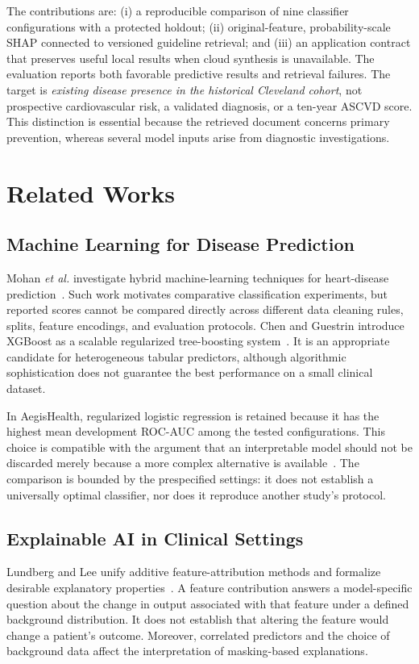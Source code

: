 \documentclass[journal]{IEEEtran}
\newcommand{\system}{AegisHealth}
\begin{document}
The contributions are: (i) a reproducible comparison of nine classifier configurations with a protected holdout; (ii) original-feature, probability-scale SHAP connected to versioned guideline retrieval; and (iii) an application contract that preserves useful local results when cloud synthesis is unavailable. The evaluation reports both favorable predictive results and retrieval failures. The target is \emph{existing disease presence in the historical Cleveland cohort}, not prospective cardiovascular risk, a validated diagnosis, or a ten-year ASCVD score. This distinction is essential because the retrieved document concerns primary prevention, whereas several model inputs arise from diagnostic investigations.

\section{Related Works}
\subsection{Machine Learning for Disease Prediction}
Mohan \emph{et al.} investigate hybrid machine-learning techniques for heart-disease prediction~\cite{mohan2019}. Such work motivates comparative classification experiments, but reported scores cannot be compared directly across different data cleaning rules, splits, feature encodings, and evaluation protocols. Chen and Guestrin introduce XGBoost as a scalable regularized tree-boosting system~\cite{chen2016}. It is an appropriate candidate for heterogeneous tabular predictors, although algorithmic sophistication does not guarantee the best performance on a small clinical dataset.

In \system{}, regularized logistic regression is retained because it has the highest mean development ROC-AUC among the tested configurations. This choice is compatible with the argument that an interpretable model should not be discarded merely because a more complex alternative is available~\cite{rudin2019}. The comparison is bounded by the prespecified settings: it does not establish a universally optimal classifier, nor does it reproduce another study's protocol.

\subsection{Explainable AI in Clinical Settings}
Lundberg and Lee unify additive feature-attribution methods and formalize desirable explanatory properties~\cite{lundberg2017}. A feature contribution answers a model-specific question about the change in output associated with that feature under a defined background distribution. It does not establish that altering the feature would change a patient's outcome. Moreover, correlated predictors and the choice of background data affect the interpretation of masking-based explanations.
\end{document}

